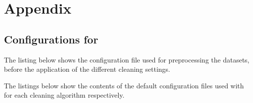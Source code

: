 \chapter{Appendix}

\section{Configurations for \ctapipe{}}
\label{ap:config_files}

The listing below shows the configuration file used for preprocessing the datasets, \ie{} before the
application of the different cleaning settings.
\begin{spacing}{0.5}
    \begin{mdframed}[backgroundcolor=codebg, hidealllines=true, leftmargin=0cm,rightmargin=0cm, skipabove=0pt, innerleftmargin=0,innerrightmargin=0,]
    
    \end{mdframed}
\end{spacing}

The listings below show the contents of the default configuration files used with \ctapipe{}
for each cleaning algorithm respectively.

